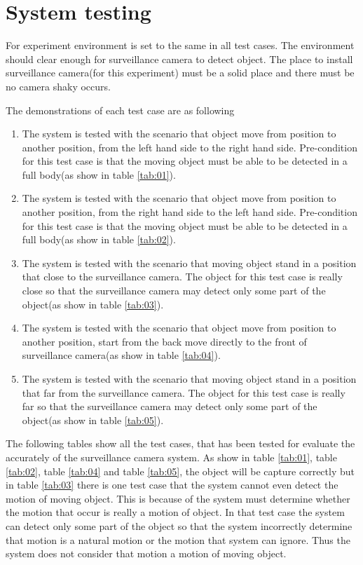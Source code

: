 
\chapter{System testing} %

\label{AppendixA} %

For experiment environment is set to the same in all test cases. The environment should clear enough for surveillance camera to detect object. The place to install surveillance camera(for this experiment) must be a solid place and there must be no camera shaky occurs.

The demonstrations of each test case are as following
\begin{enumerate}
	\item The system is tested with the scenario that object move from position to another position, from the left hand side to the right hand side. Pre-condition for this test case is that the moving object must be able to be detected in a full body(as show in table \ref{tab:01}).
	\item The system is tested with the scenario that object move from position to another position, from the right hand side to the left hand side. Pre-condition for this test case is that the moving object must be able to be detected in a full body(as show in table \ref{tab:02}).
	\item The system is tested with the scenario that moving object stand in a position that close to the surveillance camera. The object for this test case is really close so that the surveillance camera may detect only some part of the object(as show in table \ref{tab:03}).
	\item The system is tested with the scenario that object move from position to another position, start from the back move directly to the front of surveillance camera(as show in table \ref{tab:04}).
	\item The system is tested with the scenario that moving object stand in a position that far from the surveillance camera. The object for this test case is really far so that the surveillance camera may detect only some part of the object(as show in table \ref{tab:05}).
\end{enumerate}

The following tables show all the test cases, that has been tested for evaluate the accurately of the surveillance camera system. As show in table \ref{tab:01}, table \ref{tab:02}, table \ref{tab:04} and table \ref{tab:05}, the object will be capture correctly but in table \ref{tab:03} there is one test case that the system cannot even detect the motion of moving object. This is because of the system must determine whether the motion that occur is really a motion of object. In that test case the system can detect only some part of the object so that the system incorrectly determine that motion is a natural motion or the motion that system can ignore. Thus the system does not consider that motion a motion of moving object. 

